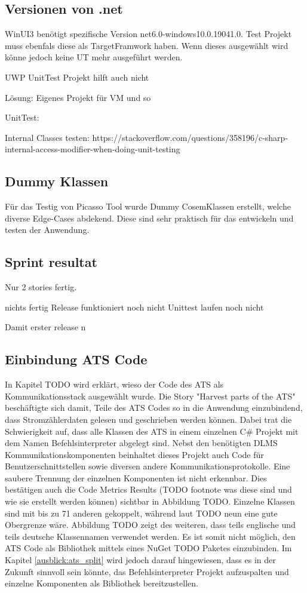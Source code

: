\subsection{Versionen von .net}
WinUI3 benötigt spezifische Version net6.0-windows10.0.19041.0.
Test Projekt muss ebenfals diese als TargetFramwork haben.
Wenn dieses ausgewählt wird könne jedoch keine UT mehr ausgeführt werden.

UWP UnitTest Projekt hilft auch nicht

Lösung:
Eigenes Projekt für VM und so




UnitTest:

Internal Classes testen:
https://stackoverflow.com/questions/358196/c-sharp-internal-access-modifier-when-doing-unit-testing

\subsection{Dummy Klassen}
Für das Testig von Picasso Tool wurde Dummy CosemKlassen erstellt, welche diverse Edge-Cases abdekend.
Diese sind sehr praktisch für das entwickeln und testen der Anwendung.


\subsection{Sprint resultat}
Nur 2 stories fertig.


nichts fertig
Release funktioniert noch nicht
Unittest laufen noch nicht

Damit erster release n



\subsection{Einbindung ATS Code}\label{s1:ats}
In Kapitel TODO wird erklärt, wieso der Code des \ac{ATS} als Kommunikationsstack ausgewählt wurde.
Die Story "Harvest parts of the ATS" beschäftigte sich damit, Teile des \ac{ATS} Codes so in die Anwendung einzubindend, dass Stromzählerdaten gelesen und geschrieben werden können.
Dabei trat die Schwierigkeit auf, dass alle Klassen des \ac{ATS} in einem einzelnen C\# Projekt mit dem Namen Befehlsinterpreter abgelegt sind.
Nebst den benötigten \ac{DLMS} Kommunikationskomponenten beinhaltet dieses Projekt auch Code für Benutzerschnittstellen sowie diversen andere Kommunikationsprotokolle.
Eine saubere Trennung der einzelnen Komponenten ist nicht erkennbar. 
Dies bestätigen auch die Code Metrics Results (TODO footnote was diese sind und wie sie erstellt werden können) sichtbar in Abbildung TODO.
Einzelne Klassen sind mit bis zu 71 anderen gekoppelt, während laut \parencite{quantitativeInvestigationRiskCodeMetrics} TODO neun eine gute Obergrenze wäre.
Abbildung TODO zeigt des weiteren, dass teils englische und teils deutsche Klassennamen verwendet werden.
Es ist somit nicht möglich, den \ac{ATS} Code als Bibliothek mittels eines NuGet TODO Paketes einzubinden.
Im Kapitel \ref{ausblick:ats_split} wird jedoch darauf hingewiesen, dass es in der Zukunft sinnvoll sein könnte,
das Befehlsinterpreter Projekt aufzuspalten und einzelne Komponenten als Bibliothek bereitzustellen.


